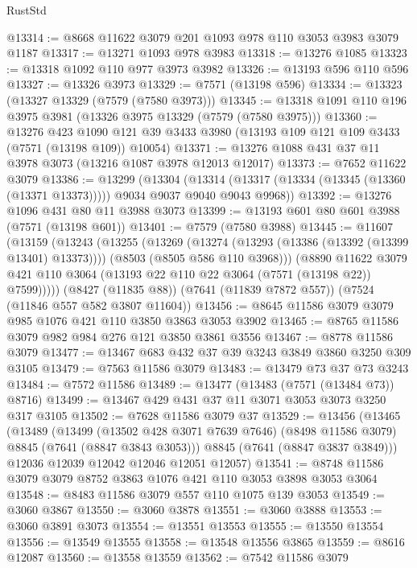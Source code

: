 \begin{lexlean}{RustStd}
\begin{coremodule}
@13314 := @8668 @11622 @3079 @201 @1093 @978 @110 @3053 @3983 @3079 @1187
@13317 := @13271 @1093 @978 @3983
@13318 := @13276 @1085
@13323 := @13318 @1092 @110 @977 @3973 @3982
@13326 := @13193 @596 @110 @596
@13327 := @13326 @3973
@13329 := @7571 (@13198 @596)
@13334 := @13323 (@13327 @13329 (@7579 (@7580 @3973)))
@13345 := @13318 @1091 @110 @196 @3975 @3981 (@13326 @3975 @13329 (@7579 (@7580 @3975)))
@13360 := @13276
    @423
    @1090
    @121
    @39
    @3433
    @3980
    (@13193 @109 @121 @109 @3433 (@7571 (@13198 @109)) @10054)
@13371 := @13276 @1088 @431 @37 @11 @3978 @3073 (@13216 @1087 @3978 @12013 @12017)
@13373 := @7652 @11622 @3079
@13386 := @13299
    (@13304
      (@13314 (@13317 (@13334 (@13345 (@13360 (@13371 @13373))))) @9034 @9037 @9040 @9043 @9968))
@13392 := @13276 @1096 @431 @80 @11 @3988 @3073
@13399 := @13193 @601 @80 @601 @3988 (@7571 (@13198 @601))
@13401 := @7579 (@7580 @3988)
@13445 := @11607
    (@13159
      (@13243
        (@13255
          (@13269
            (@13274 (@13293 (@13386 (@13392 (@13399 @13401) @13373))))
            (@8503 (@8505 @586 @110 @3968)))
          (@8890
            @11622
            @3079
            @421
            @110
            @3064
            (@13193 @22 @110 @22 @3064 (@7571 (@13198 @22)) @7599)))))
    (@8427 (@11835 @88))
    (@7641 (@11839 @7872 @557))
    (@7524 (@11846 @557 @582 @3807 @11604))
@13456 := @8645 @11586 @3079 @3079 @985 @1076 @421 @110 @3850 @3863 @3053 @3902
@13465 := @8765 @11586 @3079 @982 @984 @276 @121 @3850 @3861 @3556
@13467 := @8778 @11586 @3079
@13477 := @13467 @683 @432 @37 @39 @3243 @3849 @3860 @3250 @309 @3105
@13479 := @7563 @11586 @3079
@13483 := @13479 @73 @37 @73 @3243
@13484 := @7572 @11586
@13489 := @13477 (@13483 (@7571 (@13484 @73)) @8716)
@13499 := @13467 @429 @431 @37 @11 @3071 @3053 @3073 @3250 @317 @3105
@13502 := @7628 @11586 @3079 @37
@13529 := @13456
    (@13465
      (@13489
        (@13499
          (@13502 @428 @3071 @7639 @7646)
          (@8498 @11586 @3079)
          @8845
          (@7641 (@8847 @3843 @3053)))
        @8845
        (@7641 (@8847 @3837 @3849)))
      @12036
      @12039
      @12042
      @12046
      @12051
      @12057)
@13541 := @8748 @11586 @3079 @3079 @8752 @3863 @1076 @421 @110 @3053 @3898 @3053 @3064
@13548 := @8483 @11586 @3079 @557 @110 @1075 @139 @3053
@13549 := @3060 @3867
@13550 := @3060 @3878
@13551 := @3060 @3888
@13553 := @3060 @3891 @3073
@13554 := @13551 @13553
@13555 := @13550 @13554
@13556 := @13549 @13555
@13558 := @13548 @13556 @3865
@13559 := @8616 @12087
@13560 := @13558 @13559
@13562 := @7542 @11586 @3079

\end{coremodule}
\end{lexlean}
